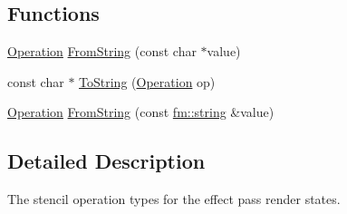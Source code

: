 \subsection*{Functions}
\begin{DoxyCompactItemize}
\item 
\hyperlink{namespaceFUDaePassStateStencilOperation_a8024554a396a96ced879eae8c80b9ea7}{Operation} \hyperlink{namespaceFUDaePassStateStencilOperation_a13e1da0570eedc3932e24bf9bcaf6e00}{FromString} (const char $\ast$value)
\item 
const char $\ast$ \hyperlink{namespaceFUDaePassStateStencilOperation_a7e0fb155ca55db3a349b364755ba8cb8}{ToString} (\hyperlink{namespaceFUDaePassStateStencilOperation_a8024554a396a96ced879eae8c80b9ea7}{Operation} op)
\item 
\hyperlink{namespaceFUDaePassStateStencilOperation_a8024554a396a96ced879eae8c80b9ea7}{Operation} \hyperlink{namespaceFUDaePassStateStencilOperation_ae9ca085be44b57cc8ae1400e33c45617}{FromString} (const \hyperlink{classfm_1_1stringT}{fm::string} \&value)
\end{DoxyCompactItemize}


\subsection{Detailed Description}
The stencil operation types for the effect pass render states. 


